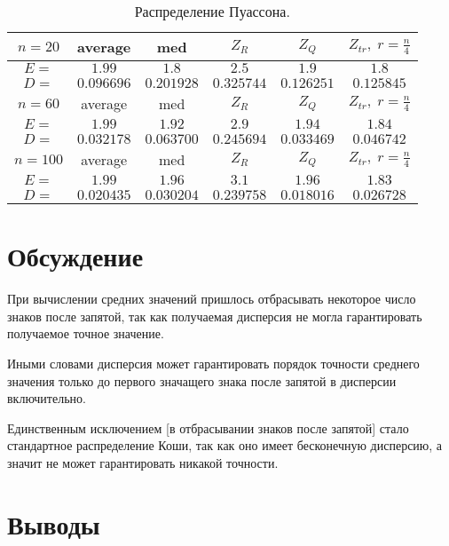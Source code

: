 \documentclass[a4]{article}
\begin{document}
\begin{table}[H]
\caption{\label{tab:poisson} Распределение Пуассона.}
\begin{center}
\begin{tabular}{|c|c|c|c|c|c|}
\hline
$n = 20$   & average & med & $Z_R$ & $Z_Q$ & $Z_{tr},\;r=\frac{n}{4}$\\ \hline
$E =$     &  	$1.99$    &	$1.8$  &  	$2.5$   & 	$1.9$  &  	$1.8$    \\ \hline
$D =$     &  	$0.096696$    &	$0.201928$    &	$0.325744$   & 	$0.126251$  &  	$0.125845$    \\ \hline
					
$n = 60$   & average & med & $Z_R$ & $Z_Q$ & $Z_{tr},\;r=\frac{n}{4}$\\ \hline
$E =$      & 	$1.99$    &	$1.92$    &	$2.9$   & 	$1.94$    &	$1.84$    \\ \hline
$D =$       &	$0.032178$    &	$0.063700$   & 	$0.245694$   & 	$0.033469$   & 	$0.046742$    \\ \hline
					
$n = 100$   & average & med & $Z_R$ & $Z_Q$ & $Z_{tr},\;r=\frac{n}{4}$\\ \hline
$E =$      & 	$1.99$    &	$1.96$    &	$3.1$  &  	$1.96$   & 	$1.83$    \\ \hline
$D =$      & 	$0.020435$    &	$0.030204$   & 	$0.239758$   & 	$0.018016$  &  	$0.026728$    \\
\hline
\end{tabular}
\end{center}
\end{table}


\section{Обсуждение}
\par При вычислении средних значений пришлось отбрасывать некоторое число знаков после запятой, так как получаемая дисперсия не могла гарантировать получаемое точное значение. \par Иными словами дисперсия может гарантировать порядок точности среднего значения только до первого значащего знака после запятой в дисперсии включительно. \par Единственным исключением [в отбрасывании знаков после запятой] стало стандартное распределение Коши, так как оно имеет бесконечную дисперсию, а значит не может гарантировать никакой точности.

\section{Выводы}
\end{document}

